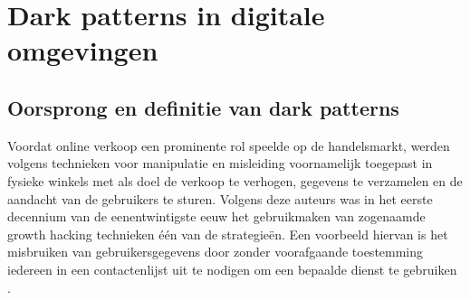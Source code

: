 %
%        
%

\section{Dark patterns in digitale omgevingen}
\label{sec:dark-patterns-digitaal}

\subsection{Oorsprong en definitie van dark patterns}
\label{subsec:definitie-oorpsr}

\vspace{1em}

Voordat online verkoop een prominente rol speelde op de handelsmarkt, werden volgens \textcite{Kollmer2022} technieken voor manipulatie en misleiding voornamelijk toegepast in fysieke winkels met als doel de verkoop te verhogen, gegevens te verzamelen en de aandacht van de gebruikers te sturen. Volgens deze auteurs was in het eerste decennium van de eenentwintigste eeuw het gebruikmaken van zogenaamde growth hacking technieken één van de strategieën. Een voorbeeld hiervan is het misbruiken van gebruikersgegevens door zonder voorafgaande toestemming iedereen in een contactenlijst uit te nodigen om een bepaalde dienst te gebruiken \autocite{Kollmer2022}. 

